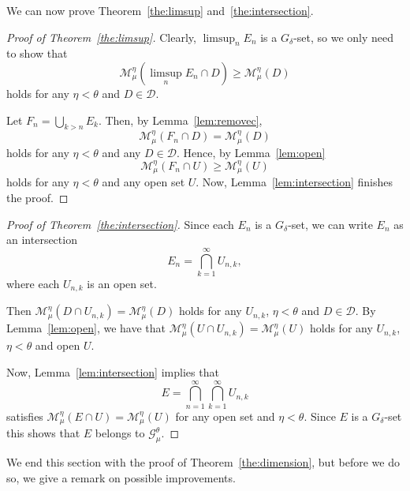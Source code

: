 \documentclass[11pt]{article}
\theoremstyle{definition}
\numberwithin{equation}{section}
\numberwithin{figure}{section}
\numberwithin{table}{section}
\begin{document}
We can now prove Theorem~\ref{the:limsup} and~\ref{the:intersection}.

\begin{proof}[Proof of Theorem~\ref{the:limsup}]
Clearly, $\limsup_n E_n$ is a $G_\delta$-set, so we only need to show that
\[
\mathscr{M}_\mu^\eta (\limsup_n E_n \cap D) \geq \mathscr{M}_\mu^\eta (D)
\]
holds for any $\eta < \theta$ and $D \in \mathscr{D}$.

Let $F_n = \bigcup_{k > n} E_k$. Then, by Lemma~\ref{lem:removec},
\[
\mathscr{M}_\mu^\eta (F_n \cap D) = \mathscr{M}_\mu^\eta (D)
\]
holds for any $\eta < \theta$ and any $D \in \mathscr{D}$. Hence, by Lemma~\ref{lem:open}
\[
\mathscr{M}_\mu^\eta (F_n \cap U) \geq \mathscr{M}_\mu^\eta (U)
\]
holds for any $\eta < \theta$ and any open set $U$. Now, Lemma~\ref{lem:intersection} finishes the proof.
\end{proof}

\begin{proof}[Proof of Theorem~\ref{the:intersection}]
Since each $E_n$ is a $G_\delta$-set, we can write $E_n$ as an intersection
\[
E_n = \bigcap_{k=1}^\infty U_{n,k},
\]
where each $U_{n,k}$ is an open set.

Then $\mathscr{M}_\mu^\eta (D \cap U_{n,k}) = \mathscr{M}_\mu^\eta (D)$ holds for any $U_{n,k}$, $\eta < \theta$ and $D \in
\mathscr{D}$. By Lemma~\ref{lem:open}, we have that $\mathscr{M}_\mu^\eta (U \cap U_{n,k}) = \mathscr{M}_\mu^\eta (U)$ holds for any $U_{n,k}$, $\eta < \theta$ and open $U$.

Now, Lemma~\ref{lem:intersection} implies that
\[
E = \bigcap_{n=1}^\infty \bigcap_{k=1}^\infty U_{n,k}
\]
satisfies $\mathscr{M}_\mu^\eta (E \cap U) = \mathscr{M}_\mu^\eta (U)$ for any open set and $\eta < \theta$. Since $E$ is a $G_\delta$-set this shows that $E$ belongs to $\mathscr{G}_\mu^\theta$.
\end{proof}

We end this section with the proof of Theorem~\ref{the:dimension}, but before we do so, we give a remark on possible improvements.
\end{document}
